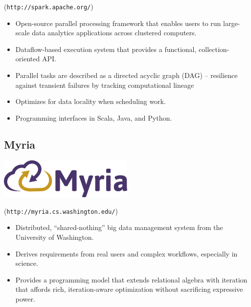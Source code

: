 \documentclass[a0,landscape]{a0poster}
\begin{document}
\begin{multicols}{3}
(\texttt{http://spark.apache.org/})

\small

\begin{itemize}
\item Open-source parallel processing framework that enables users to run large-scale data analytics applications across clustered computers.

\item Dataflow-based execution system that provides a functional, collection-oriented API.

\item Parallel tasks are described as a directed acyclic graph (DAG) -- resilience against transient failures by tracking computational lineage

\item Optimizes for data locality when scheduling work.

\item Programming interfaces in Scala, Java, and Python.

\end{itemize}

\begin{minipage}[b]{0.75\linewidth}
  \subsection*{Myria}
\end{minipage}
\begin{minipage}[b]{0.25\linewidth}
  \includegraphics[height=2cm]{myria-logo.png}
\end{minipage}

(\texttt{http://myria.cs.washington.edu/})
\begin{itemize}
  \item Distributed, ``shared-nothing'' big data management system from the University of Washington.

  \item  Derives requirements from real users and complex workflows, especially in science.

   \item Provides a programming model that extends relational algebra with iteration that affords rich, iteration-aware optimization without sacrificing expressive power.


\end{itemize}
\end{multicols}
\end{document}
